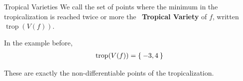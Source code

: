 \documentclass{beamer}
\DeclareMathOperator{\trop}{trop}
\DeclareMathOperator{\initial}{in}
\newcommand{\R}{\ensuremath{\mathbb{R}}}
\newcommand{\N}{\ensuremath{\mathbb{N}}}
\begin{document}
\begin{frame}{Tropical Varieties}
	We call the set of points where the minimum in the tropicalization is reached twice or more the \ \textbf{Tropical Variety} of \(f\), written \( \trop (V(f)) \).
	
	\vspace{4em}
	\pause
	In the example before,
	\begin{align}
	    \trop (V(f)) = \Set { -3 , 4 }
	\end{align}
	
	\pause
	These are exactly the non-differentiable points of the tropicalization.
	
\end{frame}

	

	
	
\end{document}
